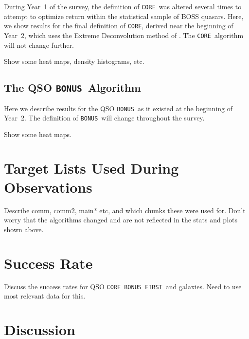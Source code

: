 \documentclass[12pt,preprint]{aastex}
\newcommand{\core}{\texttt{CORE}}
\newcommand{\bonus}{\texttt{BONUS}}
\newcommand{\first}{\texttt{FIRST}}
\begin{document}
During Year~1 of the survey, the definition of \core\ was altered several times
to attempt to optimize return within the statistical sample of BOSS quasars.
Here, we show results for the final definition of \core, derived near the
beginning of Year~2, which uses the Extreme Deconvolution method of
\citet{BovyQSOPhotoz2011}.  The \core\ algorithm will not change further.

Show some heat maps, density histograms, etc.

\subsection{The QSO \bonus\ Algorithm}

Here we describe results for the QSO \bonus\ as it existed at the beginning
of Year~2.  The definition of \bonus\ will change throughout the survey.

Show some heat maps.


\section{Target Lists Used During Observations}

Describe comm, comm2, main* etc, and which chunks these were used for.  Don't
worry that the algorithms changed and are not reflected in the stats and plots
shown above.

\section{Success Rate}

Discuss the success rates for QSO \core\, \bonus\, \first\ and galaxies.
Need to use most relevant data for this.

\section{Discussion}
\end{document}
